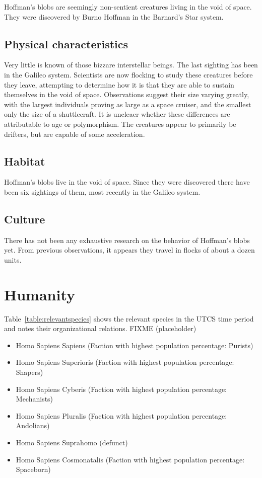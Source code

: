Hoffman's blobs are seemingly non-sentient creatures living in the
void of space. They were discovered by Burno Hoffman in the Barnard's
Star system.

\subsection{Physical characteristics}
Very little is known of those bizzare interstellar beings. The last
sighting has been in the Galileo system. Scientists are now flocking
to study these creatures before they leave, attempting to determine
how it is that they are able to sustain themselves in the void of
space. Observations suggest their size varying greatly, with the
largest individuals proving as large as a space cruiser, and the
smallest only the size of a shuttlecraft. It is uncleaer whether these
differences are attributable to age or polymorphism. The creatures
appear to primarily be drifters, but are capable of some acceleration.

\subsection{Habitat}
Hoffman's blobs live in the void of space. Since they were discovered
there have been six sightings of them, most recently in the Galileo
system.

\subsection{Culture}
There has not been any exhaustive research on the behavior of
Hoffman's blobs yet. From previous observations, it appears they
travel in flocks of about a dozen units.

\section{Humanity}

Table~\ref{table:relevantspecies} shows the relevant species in the UTCS time period and notes their organizational relations. FIXME (placeholder)

\begin{itemize}
\item	Homo Sapiens Sapiens (Faction with highest population percentage: Purists) 
\item	Homo Sapiens Superioris (Faction with highest population percentage: Shapers) 
\item	Homo Sapiens Cyberis (Faction with highest population percentage: Mechanists) 
\item	Homo Sapiens Pluralis (Faction with highest population percentage: Andolians) 
\item	Homo Sapiens Suprahomo (defunct) 
\item	Homo Sapiens Cosmonatalis (Faction with highest population percentage: Spaceborn) 
\end{itemize}
